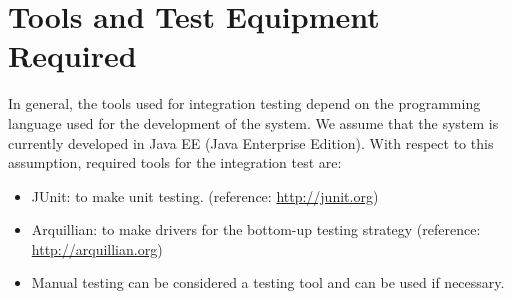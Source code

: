\documentclass[../../testPlan.tex]{subfiles}
\begin{document}
	\chapter{Tools and Test Equipment Required}

			In general, the tools used for integration testing depend on the programming language used for the development of the system.
			We assume that the system is currently developed in Java EE (Java Enterprise Edition).
			With respect to this assumption, required tools for the integration test are:
			\begin{itemize}
				\item JUnit: to make unit testing. (reference: \url{http://junit.org})
				\item Arquillian: to make drivers for the bottom-up testing strategy (reference: \url{http://arquillian.org})
				\item Manual testing can be considered a testing tool and can be used if necessary.
			\end{itemize}
\end{document}
